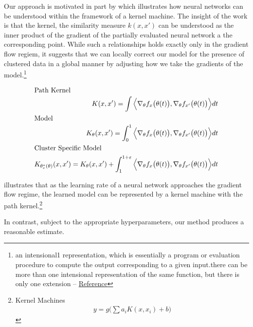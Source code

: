 \documentclass[a4paper,12pt]{article}
\begin{document}
Our approach is motivated in part by \cite{domingos2020every} which illustrates how neural networks can be understood within the framework of a kernel machine. The insight of the work is that the kernel, the similarity measure $k(x,x')$ can be understood as the inner product of the gradient of the partially evaluated neural network a the corresponding point. While such a relationships holds exactly only in the gradient flow regiem, it suggests that we can locally correct our model for the presence of clustered data in a global manner by adjusting how we take the gradients of the model.\footnote{an intensional1
representation, which is essentially a program or evaluation procedure to compute
the output corresponding to a given input.there can be more than one intensional representation of the same function, but there is only one
extension -- \href{https://www.cs.cornell.edu/courses/cs6110/2022sp/lectures/lec01.pdf}{Reference}}   

\begin{align*}
\intertext{Path Kernel}
K(x,x') = \int \Big \langle \nabla _{\theta} f_x\big(\theta(t)\big), \nabla _{\theta}f_{x'}\big(\theta(t)\big) \Big\rangle dt \\ 
\intertext{Model}
K_{\theta}(x,x') = \int _0^1 \Big \langle \nabla _{\theta} f_x\big(\theta(t)\big), \nabla _{\theta}f_{x'}\big(\theta(t)\big) \Big\rangle dt \\ 
\intertext{Cluster Specific Model}
K_{\theta^*_c(\theta)}(x,x') = K_{\theta}(x,x') + \int _1^{1+ \varepsilon} \Big \langle \nabla _{\theta} f_x\big(\theta(t)\big), \nabla _{\theta}f_{x'}\big(\theta(t)\big) \Big\rangle dt \\ 
\end{align*} 


illustrates that as the learning rate of a neural network approaches the gradient flow regime, the learned model can be represented by a kernel machine with the path kernel.\footnote{Kernel Machines\begin{align*}
    y = g \Big(\sum a_iK(x, x_i) + b \Big) 
\end{align*}} 




In contrast, subject to the appropriate hyperparameters, our method produces a reasonable estimate.
\end{document}
